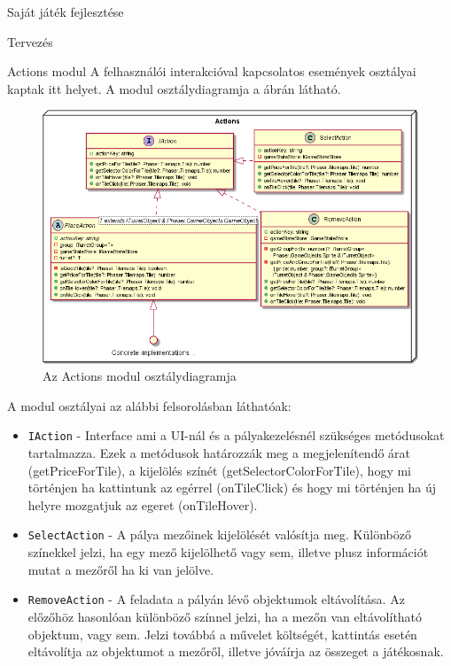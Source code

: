 \begin{MyChapter}{Saját játék fejlesztése}
\begin{MySection}{Tervezés}
		\begin{MySubSection}{Actions modul}
			A felhasználói interakcióval kapcsolatos események osztályai kaptak itt helyet.
			A modul osztálydiagramja a  ábrán látható.
			
			\begin{figure}[h!]
				\centering
				\includegraphics[width=1\textwidth]{kepek/uml/actions/action-pt1.png}
				\caption{Az Actions modul osztálydiagramja}
				\label{fig:uml:action}
			\end{figure}
			
			A modul osztályai az alábbi felsorolásban láthatóak:
			\begin{itemize}
				\item \texttt{IAction} - Interface ami a UI-nál és a pályakezelésnél szükséges metódusokat tartalmazza. Ezek a metódusok határozzák meg a megjelenítendő árat (getPriceForTile), a kijelölés színét (getSelectorColorForTile), hogy mi történjen ha kattintunk az egérrel (onTileClick) és hogy mi történjen ha új helyre mozgatjuk az egeret (onTileHover).
				
				\item \texttt{SelectAction} - A pálya mezőinek kijelölését valósítja meg. Különböző színekkel jelzi, ha egy mező kijelölhető vagy sem, illetve plusz információt mutat a mezőről ha ki van jelölve.
				
				\item \texttt{RemoveAction} - A feladata a pályán lévő objektumok eltávolítása. Az előzőhöz hasonlóan különböző színnel jelzi, ha a mezőn van eltávolítható objektum, vagy sem. Jelzi továbbá a művelet költségét, kattintás esetén eltávolítja az objektumot a mezőről, illetve jóváírja az összeget a játékosnak.
				

\end{itemize}
\end{MySubSection}
\end{MySection}
\end{MyChapter}
